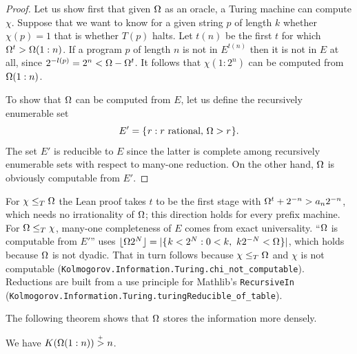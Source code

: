  \begin{proof}
  \leanok
Let us show first that given \( \Omega \) as an oracle, a Turing machine can
compute \( \chi \).
Suppose that we want to know for a given string \( p \) of length \( k \) 
whether \( \chi(p) = 1 \) that is whether \( T(p) \) halts.
Let \( t(n) \) be the first \( t \) for which \( \Omega^{t} > \Omega(1:n) \).
If a program \( p \) of length \( n \) is not in \( E^{t(n)} \) then it is not in \( E \)
at all, since \( 2^{-l(p)} = 2^{n} < \Omega - \Omega^{t} \).
It follows that \( \chi(1 : 2^{n}) \) can be computed from \( \Omega(1:n) \).

To show that \( \Omega \) can be computed from \( E \), let
us define the recursively enumerable set
 \[
   E' = \mathopen\{\mskip 1mu r : r \text{ rational, } \Omega > r\mskip 1mu\mathclose\}.
 \]
The set \( E' \) is reducible to \( E \) since the latter
is complete among recursively enumerable sets
with respect to many-one reduction.
On the other hand, \( \Omega \) is obviously computable from \( E' \).
 \end{proof}

\begin{formalization}
For \( \chi \le_{T} \Omega \) the Lean proof takes \( t \) to be the first stage with
\( \Omega^{t} + 2^{-n} > a_{n} 2^{-n} \), which needs no irrationality of \( \Omega \); this direction
holds for every prefix machine. For \( \Omega \le_{T} \chi \), many-one completeness of \( E \)
comes from exact universality. ``\( \Omega \) is computable from \( E' \)'' uses
\( \lfloor \Omega 2^{N} \rfloor = |\mathopen\{\mskip 1mu k < 2^{N} : 0 < k,\ k 2^{-N} < \Omega\mskip 1mu\mathclose\}| \), which holds
because \( \Omega \) is not dyadic. That in turn follows because \( \chi \le_{T} \Omega \) and \( \chi \)
is not computable (\texttt{Kolmogorov.Information.Turing.chi\_not\_computable}). Reductions are
built from a use principle for Mathlib's \texttt{RecursiveIn}
(\texttt{Kolmogorov.Information.Turing.turingReducible\_of\_table}).
\end{formalization}

The following theorem shows that \( \Omega \) stores the information more densely.

 \begin{theorem}\label{thm:Og-complex}
  \leanok
 We have \( K(\Omega(1:n)) \stackrel{{}_+}{>} n \).
 \end{theorem}

